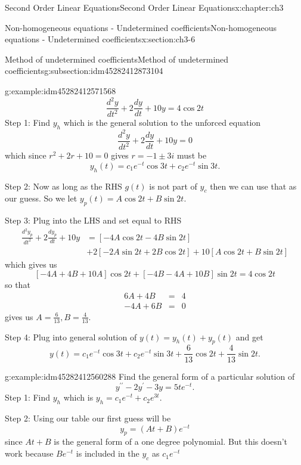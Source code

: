 \documentclass[oneside,10pt,]{book}
\numberwithin{equation}{section}
\numberwithin{equation}{section}
\newcommand{\amp}{&}
\begin{document}
\begin{chapterptx}{Second Order Linear Equations}{}{Second Order Linear Equations}{}{}{x:chapter:ch3}
\begin{sectionptx}{Non-homogeneous equations - Undetermined coefficients}{}{Non-homogeneous equations - Undetermined coefficients}{}{}{x:section:ch3-6}
\begin{subsectionptx}{Method of undetermined coefficients}{}{Method of undetermined coefficients}{}{}{g:subsection:idm45282412873104}
\begin{example}{}{g:example:idm45282412571568}
\begin{equation*}
\frac{d^{2}y}{dt^{2}}+2\frac{dy}{dt}+10y=4\cos2t
\end{equation*}
Step 1: Find \(y_{h}\) which is the general solution to the unforced equation%
\begin{equation*}
\frac{d^{2}y}{dt^{2}}+2\frac{dy}{dt}+10y=0
\end{equation*}
which since \(r^{2}+2r+10=0\) gives \(r=-1\pm3i\) must be%
\begin{equation*}
y_{h}(t)=c_{1}e^{-t}\cos3t+c_{2}e^{-t}\sin3t.
\end{equation*}
%
\par
Step 2: Now as long as the RHS \(g(t)\) is not part of \(y_{c}\) then we can use that as our guess. So we let \(y_{p}(t)=A\cos2t+B\sin2t\).%
\par
Step 3: Plug into the LHS and set equal to RHS%
\begin{align*}
\frac{d^{2}y_{p}}{dt^{2}}+2\frac{dy_{p}}{dt}+10y \amp = \left[-4A\cos2t-4B\sin2t\right]\\
\amp +2\left[-2A\sin2t+2B\cos2t\right]+10\left[A\cos2t+B\sin2t\right]
\end{align*}
which gives us%
\begin{equation*}
\left[-4A+4B+10A\right]\cos2t+\left[-4B-4A+10B\right]\sin2t=4\cos2t
\end{equation*}
so that%
\begin{align*}
6A+4B \amp = \amp 4\\
-4A+6B \amp = \amp 0
\end{align*}
gives us \(A=\frac{6}{13},B=\frac{4}{13}\).%
\par
Step 4: Plug into general solution of \(y(t)=y_{h}(t)+y_{p}(t)\) and get%
\begin{equation*}
y(t)=c_{1}e^{-t}\cos3t+c_{2}e^{-t}\sin3t+\frac{6}{13}\cos2t+\frac{4}{13}\sin2t.
\end{equation*}
%
\end{example}
\begin{example}{}{g:example:idm45282412560288}%
Find the general form of a particular solution of%
\begin{equation*}
y^{\prime\prime}-2y^{\prime}-3y=5te^{-t}.
\end{equation*}
Step 1: Find \(y_{h}\) which is \(y_{h}=c_{1}e^{-t}+c_{2}e^{3t}\).%
\par
Step 2: Using our table our first guess will be%
\begin{equation*}
y_{p}=\left(At+B\right)e^{-t}
\end{equation*}
since \(At+B\) is the general form of a one degree polynomial. But this doesn't work because \(Be^{-t}\) is included in the \(y_{c}\) as \(c_{1}e^{-t}\)%

\end{example}
\end{subsectionptx}
\end{sectionptx}
\end{chapterptx}
\end{document}
